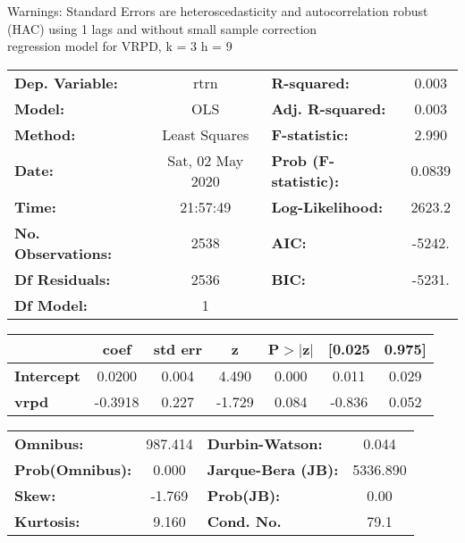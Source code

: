 Warnings: \newline
 [1] Standard Errors are heteroscedasticity and autocorrelation robust (HAC) using 1 lags and without small sample correction\\ 

regression model for VRPD, k = 3 h = 9\begin{center}
\begin{tabular}{lclc}
\toprule
\textbf{Dep. Variable:}    &       rtrn       & \textbf{  R-squared:         } &     0.003   \\
\textbf{Model:}            &       OLS        & \textbf{  Adj. R-squared:    } &     0.003   \\
\textbf{Method:}           &  Least Squares   & \textbf{  F-statistic:       } &     2.990   \\
\textbf{Date:}             & Sat, 02 May 2020 & \textbf{  Prob (F-statistic):} &   0.0839    \\
\textbf{Time:}             &     21:57:49     & \textbf{  Log-Likelihood:    } &    2623.2   \\
\textbf{No. Observations:} &        2538      & \textbf{  AIC:               } &    -5242.   \\
\textbf{Df Residuals:}     &        2536      & \textbf{  BIC:               } &    -5231.   \\
\textbf{Df Model:}         &           1      & \textbf{                     } &             \\
\bottomrule
\end{tabular}
\begin{tabular}{lcccccc}
                   & \textbf{coef} & \textbf{std err} & \textbf{z} & \textbf{P$> |$z$|$} & \textbf{[0.025} & \textbf{0.975]}  \\
\midrule
\textbf{Intercept} &       0.0200  &        0.004     &     4.490  &         0.000        &        0.011    &        0.029     \\
\textbf{vrpd}      &      -0.3918  &        0.227     &    -1.729  &         0.084        &       -0.836    &        0.052     \\
\bottomrule
\end{tabular}
\begin{tabular}{lclc}
\textbf{Omnibus:}       & 987.414 & \textbf{  Durbin-Watson:     } &    0.044  \\
\textbf{Prob(Omnibus):} &   0.000 & \textbf{  Jarque-Bera (JB):  } & 5336.890  \\
\textbf{Skew:}          &  -1.769 & \textbf{  Prob(JB):          } &     0.00  \\
\textbf{Kurtosis:}      &   9.160 & \textbf{  Cond. No.          } &     79.1  \\
\bottomrule
\end{tabular}
\end{center}

